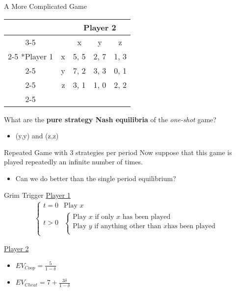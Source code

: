 
\begin{frame}{A More Complicated Game}
  \begin{center}
  \begin{tabular}{cr|c|c|c|}
  	& \multicolumn{1}{c}{} & \multicolumn{3}{c}{Player 2}\\ \cline{3-5}
    \multicolumn{1}{c}{} & \multicolumn{1}{c}{} & x & y & z \\\cline{2-5}
    \multirow{3}*{Player 1}  & x & 5, 5 & 2, 7 & 1, 3 \\\cline{2-5}
                             & y & 7, 2 & 3, 3 & 0, 1 \\\cline{2-5}
                             & z & 3, 1 & 1, 0 & 2, 2 \\\cline{2-5}
  \end{tabular}
  \end{center}

  What are the \textbf{pure strategy Nash equilibria} of the \textit{one-shot} game?
  \pause
  \begin{itemize}
    \item (y,y) and (z,z)
  \end{itemize}
\end{frame}

\begin{frame}{Repeated Game with 3 strategies per period}
  Now suppose that this game is played repeatedly an infinite number of times.  
  \begin{itemize}
    \item Can we do better than the single period equilibrium? 
  \end{itemize}
\end{frame}

\begin{frame}{Grim Trigger}
  \underline{Player 1} 
  \begin{align*}
    \begin{cases}
      t = 0 & \text{Play } x  \\ 
      t > 0 & 
      \begin{cases}
        \text{Play } x \text{ if only } x \text{ has been played } \\
        \text{Play } y \text{ if anything other than } x \text{has been played} \\
      \end{cases}
    \end{cases} 
  \end{align*}

  \underline{Player 2}
  \begin{itemize}
    \item $EV_{Coop} = \frac{5}{1-\delta}$ 
    \item $EV_{Cheat} = 7 + \frac{3\delta}{1-\delta}$
  \end{itemize}
\end{frame}

